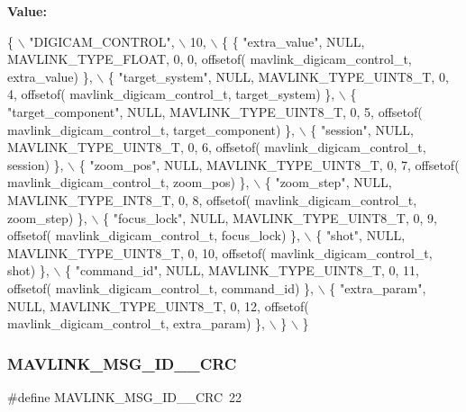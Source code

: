 {\bfseries Value\+:}
\begin{DoxyCode}
\{ \(\backslash\)
    \textcolor{stringliteral}{"DIGICAM\_CONTROL"}, \(\backslash\)
    10, \(\backslash\)
    \{  \{ \textcolor{stringliteral}{"extra\_value"}, NULL, MAVLINK_TYPE_FLOAT, 0, 0, offsetof(
      mavlink_digicam_control_t, extra\_value) \}, \(\backslash\)
         \{ \textcolor{stringliteral}{"target\_system"}, NULL, MAVLINK_TYPE_UINT8_T, 0, 4, offsetof(
      mavlink_digicam_control_t, target\_system) \}, \(\backslash\)
         \{ \textcolor{stringliteral}{"target\_component"}, NULL, MAVLINK_TYPE_UINT8_T, 0, 5, offsetof(
      mavlink_digicam_control_t, target\_component) \}, \(\backslash\)
         \{ \textcolor{stringliteral}{"session"}, NULL, MAVLINK_TYPE_UINT8_T, 0, 6, offsetof(
      mavlink_digicam_control_t, session) \}, \(\backslash\)
         \{ \textcolor{stringliteral}{"zoom\_pos"}, NULL, MAVLINK_TYPE_UINT8_T, 0, 7, offsetof(
      mavlink_digicam_control_t, zoom\_pos) \}, \(\backslash\)
         \{ \textcolor{stringliteral}{"zoom\_step"}, NULL, MAVLINK_TYPE_INT8_T, 0, 8, offsetof(
      mavlink_digicam_control_t, zoom\_step) \}, \(\backslash\)
         \{ \textcolor{stringliteral}{"focus\_lock"}, NULL, MAVLINK_TYPE_UINT8_T, 0, 9, offsetof(
      mavlink_digicam_control_t, focus\_lock) \}, \(\backslash\)
         \{ \textcolor{stringliteral}{"shot"}, NULL, MAVLINK_TYPE_UINT8_T, 0, 10, offsetof(
      mavlink_digicam_control_t, shot) \}, \(\backslash\)
         \{ \textcolor{stringliteral}{"command\_id"}, NULL, MAVLINK_TYPE_UINT8_T, 0, 11, offsetof(
      mavlink_digicam_control_t, command\_id) \}, \(\backslash\)
         \{ \textcolor{stringliteral}{"extra\_param"}, NULL, MAVLINK_TYPE_UINT8_T, 0, 12, offsetof(
      mavlink_digicam_control_t, extra\_param) \}, \(\backslash\)
         \} \(\backslash\)
\}
\end{DoxyCode}
\mbox{\label{mavlink__msg__digicam__control_8h_a8d489ae4494ed33c6d02390149446b87}} 
\subsubsection{M\+A\+V\+L\+I\+N\+K\+\_\+\+M\+S\+G\+\_\+\+I\+D\+\_\+\_\+\+C\+RC}
{\footnotesize\ttfamily \#define M\+A\+V\+L\+I\+N\+K\+\_\+\+M\+S\+G\+\_\+\+I\+D\+\_\+\_\+\+C\+RC~22}

